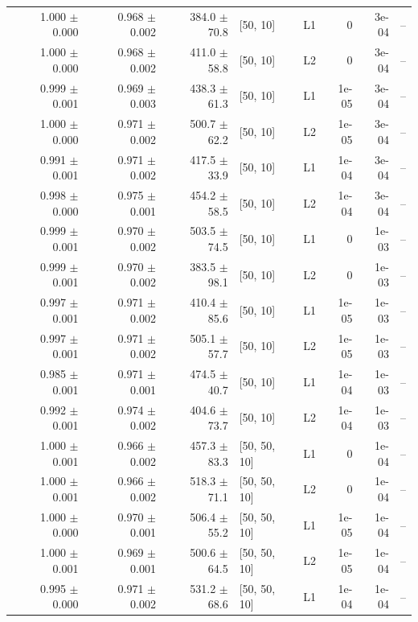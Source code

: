 \documentclass[reprint,english,notitlepage, floatfix]{revtex4-2}  %
\begin{document}
\begin{longtable}{r r r l l r r l}
\rowcolor{Cluster2} 1.000 $\pm$ 0.000 & 0.968 $\pm$ 0.002 & 384.0 $\pm$ 70.8 & [50, 10] & L1 & 0 & 3e-04 & -- \\
\rowcolor{Cluster2} 1.000 $\pm$ 0.000 & 0.968 $\pm$ 0.002 & 411.0 $\pm$ 58.8 & [50, 10] & L2 & 0 & 3e-04 & -- \\
\rowcolor{Cluster2} 0.999 $\pm$ 0.001 & 0.969 $\pm$ 0.003 & 438.3 $\pm$ 61.3 & [50, 10] & L1 & 1e-05 & 3e-04 & -- \\
\rowcolor{Cluster2} 1.000 $\pm$ 0.000 & 0.971 $\pm$ 0.002 & 500.7 $\pm$ 62.2 & [50, 10] & L2 & 1e-05 & 3e-04 & -- \\
\rowcolor{Cluster2} 0.991 $\pm$ 0.001 & 0.971 $\pm$ 0.002 & 417.5 $\pm$ 33.9 & [50, 10] & L1 & 1e-04 & 3e-04 & -- \\
\rowcolor{Cluster2} 0.998 $\pm$ 0.000 & 0.975 $\pm$ 0.001 & 454.2 $\pm$ 58.5 & [50, 10] & L2 & 1e-04 & 3e-04 & -- \\
\rowcolor{Cluster2} 0.999 $\pm$ 0.001 & 0.970 $\pm$ 0.002 & 503.5 $\pm$ 74.5 & [50, 10] & L1 & 0 & 1e-03 & -- \\
\rowcolor{Cluster2} 0.999 $\pm$ 0.001 & 0.970 $\pm$ 0.002 & 383.5 $\pm$ 98.1 & [50, 10] & L2 & 0 & 1e-03 & -- \\
\rowcolor{Cluster2} 0.997 $\pm$ 0.001 & 0.971 $\pm$ 0.002 & 410.4 $\pm$ 85.6 & [50, 10] & L1 & 1e-05 & 1e-03 & -- \\
\rowcolor{Cluster2} 0.997 $\pm$ 0.001 & 0.971 $\pm$ 0.002 & 505.1 $\pm$ 57.7 & [50, 10] & L2 & 1e-05 & 1e-03 & -- \\
\rowcolor{Cluster2} 0.985 $\pm$ 0.001 & 0.971 $\pm$ 0.001 & 474.5 $\pm$ 40.7 & [50, 10] & L1 & 1e-04 & 1e-03 & -- \\
\rowcolor{Cluster2} 0.992 $\pm$ 0.001 & 0.974 $\pm$ 0.002 & 404.6 $\pm$ 73.7 & [50, 10] & L2 & 1e-04 & 1e-03 & -- \\
\rowcolor{Cluster2} 1.000 $\pm$ 0.001 & 0.966 $\pm$ 0.002 & 457.3 $\pm$ 83.3 & [50, 50, 10] & L1 & 0 & 1e-04 & -- \\
\rowcolor{Cluster2} 1.000 $\pm$ 0.001 & 0.966 $\pm$ 0.002 & 518.3 $\pm$ 71.1 & [50, 50, 10] & L2 & 0 & 1e-04 & -- \\
\rowcolor{Cluster2} 1.000 $\pm$ 0.000 & 0.970 $\pm$ 0.001 & 506.4 $\pm$ 55.2 & [50, 50, 10] & L1 & 1e-05 & 1e-04 & -- \\
\rowcolor{Cluster2} 1.000 $\pm$ 0.001 & 0.969 $\pm$ 0.001 & 500.6 $\pm$ 64.5 & [50, 50, 10] & L2 & 1e-05 & 1e-04 & -- \\
\rowcolor{Cluster2} 0.995 $\pm$ 0.000 & 0.971 $\pm$ 0.002 & 531.2 $\pm$ 68.6 & [50, 50, 10] & L1 & 1e-04 & 1e-04 & -- \\

\end{longtable}
\end{document}
